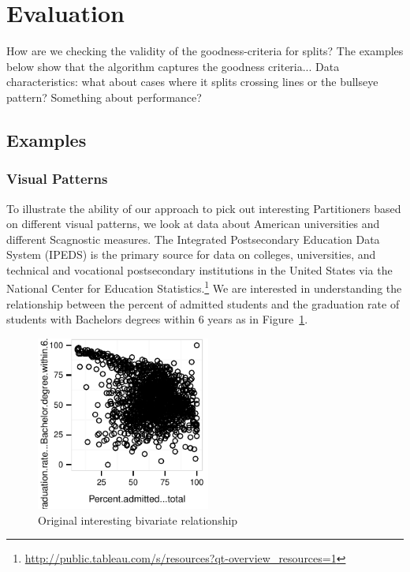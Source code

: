 \section{Evaluation}
\label{sec:evaluation}
How are we checking the validity of the goodness-criteria for splits? The examples below show that the algorithm captures the goodness criteria...
Data characteristics: what about cases where it splits crossing lines or the bullseye pattern?
Something about performance?

\subsection{Examples}
\subsubsection{Visual Patterns}
To illustrate the ability of our approach to pick out interesting Partitioners based on different visual patterns, we look at data about American universities and different Scagnostic measures. The Integrated Postsecondary Education Data System (IPEDS) is the primary source for data on colleges, universities, and technical and vocational postsecondary institutions in the United States via the National Center for Education Statistics.\footnote{\url{http://public.tableau.com/s/resources?qt-overview_resources=1}} We are interested in understanding the relationship between the percent of admitted students and the graduation rate of students with Bachelors degrees within $6$ years as in Figure~\ref{fig:original1}. 
\begin{figure}
 \centering 
\includegraphics[width=2.25in,height=2.25in]{images/Percent_admitted_total-Graduation_rate_Bachelor_degree_within_6_years_total.pdf}
  \caption{Original interesting bivariate relationship}
 \label{fig:original1}
\end{figure}

